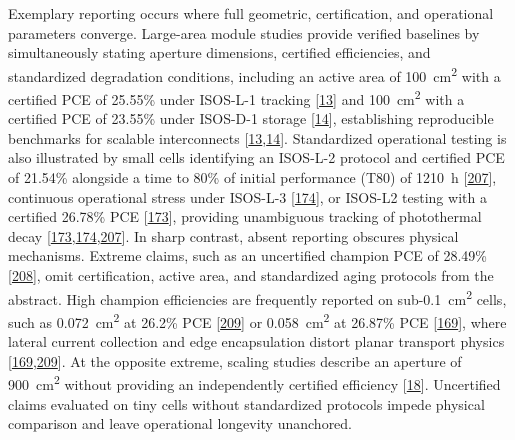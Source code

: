\documentclass[
  11pt,
]{article}
\begin{document}
Exemplary reporting occurs where full geometric, certification, and
operational parameters converge. Large-area module studies provide
verified baselines by simultaneously stating aperture dimensions,
certified efficiencies, and standardized degradation conditions,
including an active area of \qty{100}{\centi\meter\squared} with a
certified PCE of 25.55\% under ISOS-L-1 tracking
{[}\href{https://doi.org/10.1126/sciadv.aec3238}{13}{]} and
\qty{100}{\centi\meter\squared} with a certified PCE of 23.55\% under
ISOS-D-1 storage
{[}\href{https://doi.org/10.1038/s41467-026-69685-6}{14}{]},
establishing reproducible benchmarks for scalable interconnects
{[}\href{https://doi.org/10.1126/sciadv.aec3238}{13},\href{https://doi.org/10.1038/s41467-026-69685-6}{14}{]}.
Standardized operational testing is also illustrated by small cells
identifying an ISOS-L-2 protocol and certified PCE of 21.54\% alongside
a time to 80\% of initial performance (T80) of \qty{1210}{\hour}
{[}\href{https://doi.org/10.1038/s41467-026-72099-z}{207}{]}, continuous
operational stress under ISOS-L-3
{[}\href{https://doi.org/10.1021/acsenergylett.5c03999}{174}{]}, or
ISOS-L2 testing with a certified 26.78\% PCE
{[}\href{https://doi.org/10.1002/adma.202520432}{173}{]}, providing
unambiguous tracking of photothermal decay
{[}\href{https://doi.org/10.1002/adma.202520432}{173},\href{https://doi.org/10.1021/acsenergylett.5c03999}{174},\href{https://doi.org/10.1038/s41467-026-72099-z}{207}{]}.
In sharp contrast, absent reporting obscures physical mechanisms.
Extreme claims, such as an uncertified champion PCE of 28.49\%
{[}\href{https://doi.org/10.1007/s40820-025-02006-6}{208}{]}, omit
certification, active area, and standardized aging protocols from the
abstract. High champion efficiencies are frequently reported on
sub-\qty{0.1}{\centi\meter\squared} cells, such as
\qty{0.072}{\centi\meter\squared} at 26.2\% PCE
{[}\href{https://doi.org/10.1038/s41467-025-68207-0}{209}{]} or
\qty{0.058}{\centi\meter\squared} at 26.87\% PCE
{[}\href{https://doi.org/10.1002/aenm.70925}{169}{]}, where lateral
current collection and edge encapsulation distort planar transport
physics
{[}\href{https://doi.org/10.1002/aenm.70925}{169},\href{https://doi.org/10.1038/s41467-025-68207-0}{209}{]}.
At the opposite extreme, scaling studies describe an aperture of
\qty{900}{\centi\meter\squared} without providing an independently
certified efficiency
{[}\href{https://doi.org/10.1002/adfm.202532205}{18}{]}. Uncertified
claims evaluated on tiny cells without standardized protocols impede
physical comparison and leave operational longevity unanchored.
\end{document}
